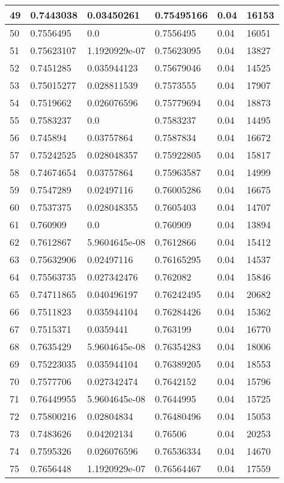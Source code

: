 \begin{longtable}{|l|l|l|l|l|l|}
49 & 0.7443038 & 0.03450261 & 0.75495166 & 0.04 & 16153 \\ \hline 
50 & 0.7556495 & 0.0 & 0.7556495 & 0.04 & 16051 \\ \hline 
51 & 0.75623107 & 1.1920929e-07 & 0.75623095 & 0.04 & 13827 \\ \hline 
52 & 0.7451285 & 0.035944123 & 0.75679046 & 0.04 & 14525 \\ \hline 
53 & 0.75015277 & 0.028811539 & 0.7573555 & 0.04 & 17907 \\ \hline 
54 & 0.7519662 & 0.026076596 & 0.75779694 & 0.04 & 18873 \\ \hline 
55 & 0.7583237 & 0.0 & 0.7583237 & 0.04 & 14495 \\ \hline 
56 & 0.745894 & 0.03757864 & 0.7587834 & 0.04 & 16672 \\ \hline 
57 & 0.75242525 & 0.028048357 & 0.75922805 & 0.04 & 15817 \\ \hline 
58 & 0.74674654 & 0.03757864 & 0.75963587 & 0.04 & 14999 \\ \hline 
59 & 0.7547289 & 0.02497116 & 0.76005286 & 0.04 & 16675 \\ \hline 
60 & 0.7537375 & 0.028048355 & 0.7605403 & 0.04 & 14707 \\ \hline 
61 & 0.760909 & 0.0 & 0.760909 & 0.04 & 13894 \\ \hline 
62 & 0.7612867 & 5.9604645e-08 & 0.7612866 & 0.04 & 15412 \\ \hline 
63 & 0.75632906 & 0.02497116 & 0.76165295 & 0.04 & 14537 \\ \hline 
64 & 0.75563735 & 0.027342476 & 0.762082 & 0.04 & 15846 \\ \hline 
65 & 0.74711865 & 0.040496197 & 0.76242495 & 0.04 & 20682 \\ \hline 
66 & 0.7511823 & 0.035944104 & 0.76284426 & 0.04 & 15362 \\ \hline 
67 & 0.7515371 & 0.0359441 & 0.763199 & 0.04 & 16770 \\ \hline 
68 & 0.7635429 & 5.9604645e-08 & 0.76354283 & 0.04 & 18006 \\ \hline 
69 & 0.75223035 & 0.035944104 & 0.76389205 & 0.04 & 18553 \\ \hline 
70 & 0.7577706 & 0.027342474 & 0.7642152 & 0.04 & 15796 \\ \hline 
71 & 0.76449955 & 5.9604645e-08 & 0.7644995 & 0.04 & 15725 \\ \hline 
72 & 0.75800216 & 0.02804834 & 0.76480496 & 0.04 & 15053 \\ \hline 
73 & 0.7483626 & 0.04202134 & 0.76506 & 0.04 & 20253 \\ \hline 
74 & 0.7595326 & 0.026076596 & 0.76536334 & 0.04 & 14670 \\ \hline 
75 & 0.7656448 & 1.1920929e-07 & 0.76564467 & 0.04 & 17559 \\ \hline 
\end{longtable}